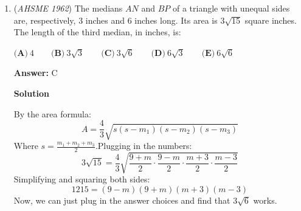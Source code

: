 \begin{enumerate}
 $2)$ $b+a$ $=$ $33$ and $b-a$ $=$ $3$.Adding the two equations we get $2b$ $=$ $36$ or $b$ $=$ $18$, which means $a$ $=$ $15$.Looking at the same restriction, we get $18^2$ + $1$ + $100$ $=$ $324$ + $101$ $=$ $425$, which is NOT a perfect square.

 Finally, $b+a$ $=$ $99$ and $b-a$ $=$ $1$.$2b$ $=$ $100$ or $b$ $=$ $50$, which means $a$ $=$ $49$.Looking at the same restriction, we get $50^2$ + $1$ + $100$ $=$ $2500$ + $101$ $=$ $2601$ $=$ $51^2$. Thus we find that the original population is $a^2$ $=$ $49^2$ $=$ $7^4$. Or $a^2$ is a multiple of $\boxed{ (B) 7}$




\textbf{Solution 2}

Let $P$ $=$ original population. Translating the word problem into a system of equations, we got:
 \begin{align} P &= x^2 \\ P + 100 &= y^2 + 1 \\ P + 200 &= z^2 \end{align}for some positive integers $x$, $y$ and $z$.Now, by subtracting $(2)$ from $(3)$ (i.e. $(3) - (2)$), we got:
 \begin{align*} 100 &= z^2 - y^2 - 1 \\ 101 &= z^2 - y^2 \\ 101 &= (z - y)(z + y) \end{align*}
Since y and z are both positive integers and 101 is a prime, by factoring, the only working solution for us is $y = 50$ and $z = 51$.Plugging that back to $(2)$ and simplify, we got $P = 2401 = (49)^2 = x^2$, a multiple of $7$.Therefore, the answer is $\boxed{(B) 7}$. -nullptr07

 


	\item (\textit{AHSME 1962}) The medians $AN$ and $BP$ of a triangle with unequal sides are, respectively, $3$ inches and $6$ inches long. Its area is $3\sqrt{15}$ square inches. The length of the third median, in inches, is:


 $\textbf{(A)}\ 4 \qquad  \textbf{(B)}\ 3\sqrt{3} \qquad  \textbf{(C)}\ 3\sqrt{6} \qquad  \textbf{(D)}\ 6\sqrt{3} \qquad  \textbf{(E)}\ 6\sqrt{6}$

 \textbf{Answer: }C



\textbf{Solution}

By the area formula:
 \[A = \frac43\sqrt{s(s-m_1)(s-m_2)(s-m_3)}\]Where $s = \frac{m_1+m_2+m_3}{2}$.Plugging in the numbers:
 \[3\sqrt{15} = \frac43\sqrt{\frac{9+m}2\cdot\frac{9-m}2\cdot\frac{m+3}2\cdot\frac{m-3}2}\]Simplifying and squaring both sides:
 \[1215 = (9-m)(9+m)(m+3)(m-3)\]Now, we can just plug in the answer choices and find that $\boxed{3\sqrt6}$ works.


\end{enumerate}
